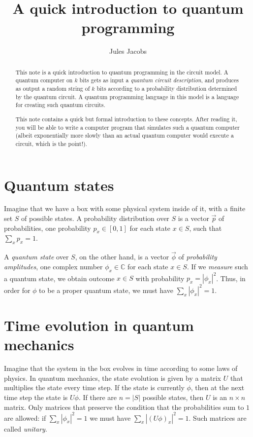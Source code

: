\documentclass[a4paper, 11pt]{article}
\title{A quick introduction to quantum programming}
\author{Jules Jacobs}
\newcommand{\C}{\mathbb{C}}
\theoremstyle{definition}
\begin{document}
\maketitle

\begin{abstract}
  This note is a quick introduction to quantum programming in the circuit model.
  A quantum computer on $k$ bits gets as input a \emph{quantum circuit description},
  and produces as output a random string of $k$ bits according to a probability distribution determined by the quantum circuit.
  A quantum programming language in this model is a language for creating such quantum circuits.

  This note contains a quick but formal introduction to these concepts.
  After reading it, you will be able to write a computer program that simulates such a quantum computer
  (albeit exponentially more slowly than an actual quantum computer would execute a circuit, which is the point!).
\end{abstract}

\section{Quantum states}

Imagine that we have a box with some physical system inside of it, with a finite set $S$ of possible states.
A probability distribution over $S$ is a vector $\vec{p}$ of probabilities, one probability $p_x \in [0,1]$ for each state $x \in S$, such that $\sum_x p_x = 1$.

A \emph{quantum state} over $S$, on the other hand, is a vector $\vec{\phi}$ of \emph{probability amplitudes}, one complex number $\phi_x \in \C$ for each state $x \in S$.
If we \emph{measure} such a quantum state, we obtain outcome $x \in S$ with probability $p_x = |\phi_x|^2$.
Thus, in order for $\phi$ to be a proper quantum state, we must have $\sum_x |\phi_x|^2 = 1$.

\section{Time evolution in quantum mechanics}

Imagine that the system in the box evolves in time according to some laws of physics.
In quantum mechanics, the state evolution is given by a matrix $U$ that multiplies the state every time step.
If the state is currently $\phi$, then at the next time step the state is $U\phi$.
If there are $n = |S|$ possible states, then $U$ is an $n \times n$ matrix.
Only matrices that preserve the condition that the probabilities sum to $1$ are allowed: if $\sum_x |\phi_x|^2 = 1$ we must have $\sum_x |(U\phi)_x|^2 = 1$.
Such matrices are called \emph{unitary}.
\end{document}
